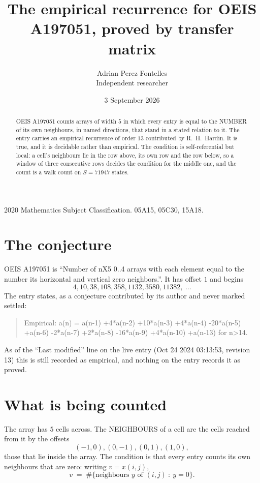 \documentclass[11pt,a4paper]{article}
\title{The empirical recurrence for OEIS A197051, proved by transfer matrix}
\author{Adrian Perez Fontelles\\ \small Independent researcher}
\date{3 September 2026}
\theoremstyle{plain}
\theoremstyle{definition}
\begin{document}
\maketitle

\begin{abstract}
OEIS A197051 counts arrays of width $5$ in which every entry is equal to the NUMBER of its own
neighbours, in named directions, that stand in a stated relation to it. The entry carries an
empirical recurrence of order $13$ contributed by R.~H.~Hardin. It is true, and it is
decidable rather than empirical. The condition is self-referential but local: a cell's
neighbours lie in the row above, its own row and the row below, so a window of three
consecutive rows decides the condition for the middle one, and the count is a walk count on
$S=71947$ states.
\end{abstract}

\noindent\small 2020 Mathematics Subject Classification. 05A15, 05C30, 15A18.\normalsize

\section{The conjecture}

OEIS A197051 is ``Number of nX5 0..4 arrays with each element equal to the number its horizontal and vertical zero neighbors.''. It has offset $1$ and begins
\[
4, 10, 38, 108, 358, 1132, 3580, 11382,\ \dots
\]
The entry states, as a conjecture contributed by its author and never marked settled:
\begin{quote}
Empirical: a(n) = a(n-1) +4*a(n-2) +10*a(n-3) +4*a(n-4) -20*a(n-5) +a(n-6) -2*a(n-7) +2*a(n-8) -16*a(n-9) +4*a(n-10) +a(n-13) for n>14.
\end{quote}
As of the ``Last modified'' line on the live entry (Oct 24 2024 03:13:53, revision 13) this is still
recorded as empirical, and nothing on the entry records it as proved.

\section{What is being counted}

The array has $5$ cells across. The NEIGHBOURS of a cell are the cells reached from it by the
offsets
\[
(-1,0), (0,-1), (0,1), (1,0),
\]
those that lie inside the array. The condition is that every entry counts its own neighbours
that are zero: writing $v=x(i,j)$,
\[
v\;=\;\#\{\text{neighbours } y \text{ of } (i,j)\ :\ y=0\} .
\]
\end{document}
